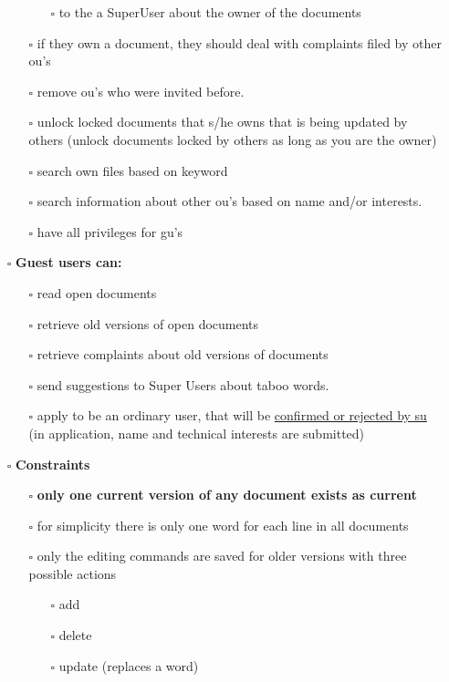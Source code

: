 \documentclass{article}
\begin{document}
\begin{itemize}
\begin{itemize}
\begin{enumerate}
				\item [$\square$] to the a SuperUser about the owner of the documents
			\end{enumerate}
			\item [$\square$] if they own a document, they should deal with complaints filed by other ou's
			\item [$\square$] remove ou's who were invited before.
			\item [$\square$] unlock locked documents that s/he owns that is being updated by others (unlock documents locked by others as long as you are the owner)
			\item [$\square$] search own files based on keyword
			\item [$\square$] search information about other ou's based on name and/or interests.
			\item [$\square$] have all privileges for gu's
		\end{itemize}
		\item [$\square$] \textbf{Guest users can:}
		\begin{itemize}
			\item [$\square$] read open documents
			\item [$\square$] retrieve old versions of open documents
			\item [$\square$] retrieve complaints about old versions of documents
			\item [$\square$] send suggestions to Super Users about taboo words.
			\item [$\square$] apply to be an ordinary user, that will be \underline{confirmed or rejected by su} (in application, name and technical interests are submitted)
		\end{itemize}
		\item [$\square$] \textbf{Constraints}
		\begin{itemize}
			\item [$\square$] \textbf{only one current version of any document exists as current}
			\item [$\square$] for simplicity there is only one word for each line in all documents
			\item [$\square$] only the editing commands are saved for older versions with three possible actions
			\begin{itemize}
				\item [$\square$] add
				\item [$\square$] delete
				\item [$\square$] update (replaces a word)

\end{itemize}
\end{itemize}
\end{itemize}
\end{document}

